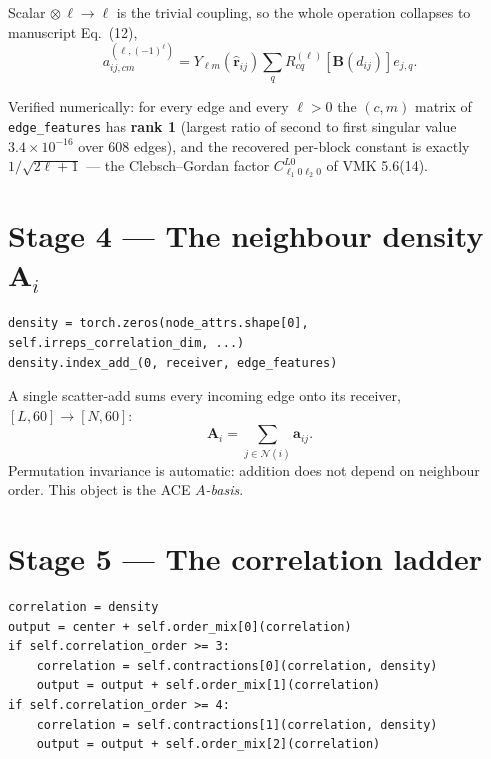 \documentclass[11pt,a4paper]{article}
\newcommand{\code}[1]{\texttt{\small #1}}
\newcommand{\NOTE}[1]{\textcolor{note}{#1}}
\begin{document}
Scalar $\otimes\,\ell \to \ell$ is the trivial coupling, so the whole operation
collapses to manuscript Eq.~(12),
\begin{equation}
a^{(\ell,(-1)^\ell)}_{ij,cm}
= Y_{\ell m}(\hat{\bm r}_{ij}) \sum_q R^{(\ell)}_{cq}\!\left[\bm B(d_{ij})\right] e_{j,q}.
\label{eq:edge}
\end{equation}

\NOTE{Verified numerically:} for every edge and every $\ell>0$ the $(c,m)$ matrix
of \code{edge\_features} has \textbf{rank 1} (largest ratio of second to first
singular value $3.4\times10^{-16}$ over 608 edges), and the recovered
per-block constant is exactly $1/\sqrt{2\ell+1}$ --- the Clebsch--Gordan factor
$C^{L0}_{\ell_1 0 \ell_2 0}$ of VMK 5.6(14).

\section{Stage 4 --- The neighbour density \texorpdfstring{$\bm A_i$}{A\_i}}

\begin{lstlisting}
density = torch.zeros(node_attrs.shape[0], self.irreps_correlation_dim, ...)
density.index_add_(0, receiver, edge_features)
\end{lstlisting}

A single scatter-add sums every incoming edge onto its receiver,
$[L,60] \to [N,60]$:
\begin{equation}
\bm A_i = \sum_{j\in\mathcal N(i)} \bm a_{ij}.
\end{equation}
Permutation invariance is automatic: addition does not depend on neighbour order.
This object is the ACE \emph{$A$-basis}.

\section{Stage 5 --- The correlation ladder}

\begin{lstlisting}
correlation = density
output = center + self.order_mix[0](correlation)
if self.correlation_order >= 3:
    correlation = self.contractions[0](correlation, density)
    output = output + self.order_mix[1](correlation)
if self.correlation_order >= 4:
    correlation = self.contractions[1](correlation, density)
    output = output + self.order_mix[2](correlation)
\end{lstlisting}
\end{document}
